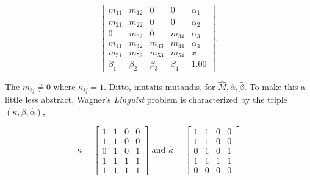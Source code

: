 \documentclass[11pt]{article}
\begin{document}
\begin{equation}
  \label{eq:m3}
      \left[
      \begin{array}{ccccc}
        m_{11} & m_{12} & 0 & 0 & \alpha_{1} \\
        m_{21} & m_{22} & 0 & 0 & \alpha_{2} \\
        0 & m_{32} & 0 & m_{34} & \alpha_{3} \\
        m_{41} & m_{42} & m_{43} & m_{44} & \alpha_{4} \\
        m_{51} & m_{52} & m_{53} & m_{54} & x \\
        \beta_{1} & \beta_{2} & \beta_{3} & \beta_{4} & 1.00
      \end{array}
\right].
\end{equation}


The $m_{ij}\neq{}0$ where $\kappa_{ij}=1$. Ditto, mutatis mutandis,
for $\hat{M},\hat{\alpha},\hat{\beta}$. To make this a little less
abstract, Wagner's \emph{Linguist} problem is characterized by the
triple $(\kappa,\beta,\hat{\alpha})$,

\begin{equation}
  \label{eq:m4}
  \kappa=\left[
  \begin{array}{cccc}
    1 & 1 & 0 & 0 \\
    1 & 1 & 0 & 0 \\
    0 & 1 & 0 & 1 \\
    1 & 1 & 1 & 1 \\
    1 & 1 & 1 & 1
  \end{array}
\right]\mbox{ and }
  \hat{\kappa}=\left[
  \begin{array}{cccc}
    1 & 1 & 0 & 0 \\
    1 & 1 & 0 & 0 \\
    0 & 1 & 0 & 1 \\
    1 & 1 & 1 & 1 \\
    0 & 0 & 0 & 0
  \end{array}
\right]
\end{equation}
\end{document}
